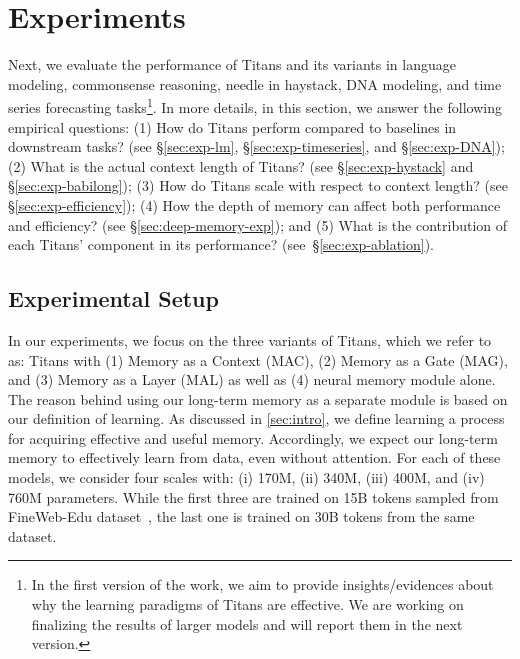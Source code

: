 \section{Experiments}\label{sec:experiments}
\lettrine[lines=3]{N}{}ext, we evaluate the performance of Titans and its variants in language modeling, commonsense reasoning, needle in haystack, DNA modeling, and time series forecasting tasks\footnote{In the first version of the work, we aim to provide insights/evidences about why the learning paradigms of Titans are effective. We are working on finalizing the results of larger models and will report them in the next version.}. In more details, in this section, we answer the following empirical questions: (1) How do Titans perform compared to baselines in downstream tasks? (\textcolor{c1}{see \S}\ref{sec:exp-lm}, \textcolor{c1}{\S}\ref{sec:exp-timeseries}, \textcolor{c1}{and \S}\ref{sec:exp-DNA}); (2) What is the actual context length of Titans? (\textcolor{c1}{see \S}\ref{sec:exp-hystack} \textcolor{c1}{and \S}\ref{sec:exp-babilong}); (3) How do Titans scale with respect to context length? (\textcolor{c1}{see \S}\ref{sec:exp-efficiency}); (4) How the depth of memory can affect both performance and efficiency? (\textcolor{c1}{see \S}\ref{sec:deep-memory-exp}); and (5) What is the contribution of each Titans' component in its performance? (\textcolor{c1}{see~\S}\ref{sec:exp-ablation}).

\subsection{Experimental Setup}\label{sec:exp-setup}
In our experiments, we focus on the three variants of Titans, which we refer to as: Titans with (1) Memory as a Context (MAC), (2) Memory as a Gate (MAG), and (3) Memory as a Layer (MAL) as well as (4) neural memory module alone. The reason behind using our long-term memory as a separate module is based on our definition of learning. As discussed in \autoref{sec:intro}, we define learning a process for acquiring effective and useful memory. Accordingly, we expect our long-term memory to effectively learn from data, even without attention. For each of these models, we consider four scales with: (i) 170M, (ii) 340M,  (iii) 400M, and (iv) 760M parameters. While the first three are trained on 15B tokens sampled from FineWeb-Edu dataset~\citep{penedo2024the}, the last one is trained on 30B tokens from the same dataset. 





